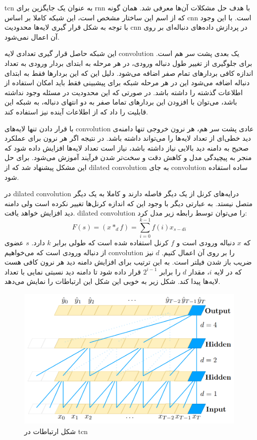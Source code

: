 \gls{tcn} به عنوان یک جایگزین برای \gls{rnn} با هدف حل مشکلات آن‌ها معرفی
شد\cite{bai2018empirical}. همان گونه که از اسم این ساختار مشخص است، این شبکه
کاملا بر اساس \gls{cnn} است. با این وجود با توجه به شکل قرار گیری لایه‌ها
محدودیت \gls{cnn} در پردازش داده‌های دنباله‌ای بر روی آن اعمال نمی‌شود.

این شبکه حاصل قرار گیری تعدادی لایه \gls{convolution} یک بعدی پشت سر هم است.
برای جلوگیری از تغییر طول دنباله ورودی، در هر مرحله به ابتدای بردار ورودی به
تعداد اندازه کافی بردارهای تمام صفر اضافه می‌شود. دلیل این که این بردارها فقط به
ابتدای دنباله اضافه می‌شود این در هر مرحله شبکه‌ برای پیشبینی فقط باید امکان
استفاده از اطلاعات گذشته را داشته باشد. در صورتی که این محدودیت در مسئله وجود
نداشته باشد، می‌توان با افزودن این بردار‌های تماما صفر به دو انتهای دنباله، به
شبکه این قابلیت را داد که از اطلاعات آینده نیز استفاده کند.

با قرار دادن تنها لایه‌های \gls{convolution} عادی پشت سر هم، هر نرون خروجی تنها
دامنه‌ی دید خطی‌ای از تعداد لایه‌ها را می‌تواند داشته باشد. در نتیجه اگر هر نرون
برای عملکرد صحیح به دامنه دید بالایی نیاز داشته باشد، نیاز است تعداد لایه‌ها
افزایش داده شود که منجر به پیچیدگی مدل و کاهش دقت و سخت‌تر شدن فرآیند آموزش
می‌شود. برای حل این مشکل پیشنهاد شد که از \gls{dilated convolution} به جای
\gls{convolution} ساده استفاده شود.

در \gls{dilated convolution} درایه‌های کرنل از یک دیگر فاصله دارند و کاملا به یک
دیگر متصل نیستد. به عبارتی دیگر با وجود این که اندازه کرنل‌ها تغییر نکرده است
ولی دامنه دید افزایش خواهد یافت. \gls{dilated convolution} را می‌توان توسط رابطه
زیر مدل کرد:
\begin{equation}
    F(s) = (x *_d f) = \sum_{i=0}^{k-1} f(i) x_{s-di}
\end{equation}
که $x$ دنباله ورودی است و $f$ کرنل استفاده شده است که طولی برابر $k$ دارد. $s$
عضوی از دنباله ورودی است که می‌خواهیم \gls{convolution} را بر روی آن اعمال کنیم.
$d$ نیز ضریب باز شدن فیلتر است. به این ترتیب برای افزایش دامنه دید هر نرون کافی
هست که در لایه $i$، مقدار $d$ را برابر $2^{i-1}$ قرار داده شود تا دامنه دید
نسبتی نمایی با تعداد لایه‌ها پیدا کند. شکل زیر به خوبی این شکل این ارتباطات را
نمایش می‌دهد.
\begin{figure}[ht]
    \centering
    \includegraphics[height=7cm]{./statics/tcn_connections.png}
    \caption{شکل ارتباطات در \gls{tcn}}
\end{figure}

